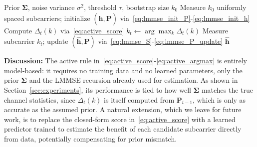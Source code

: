 \begin{algorithm}[t]
\caption{Active Pilot Selection}
\label{alg:active}
\begin{algorithmic}[1]
\Require Prior $\boldsymbol\Sigma$, noise variance $\sigma^2$, threshold $\tau$, bootstrap size $k_0$
\State Measure $k_0$ uniformly spaced subcarriers; initialize $(\hat{\mathbf h},\mathbf P)$ via~\eqref{eq:lmmse_init_P}-\eqref{eq:lmmse_init_h}
    \State Compute $\Delta_t(k)$ via~\eqref{eq:active_score}
  \EndFor
  \State $k_t \gets \arg\max_k \Delta_t(k)$
  \State Measure subcarrier $k_t$; update $(\hat{\mathbf h},\mathbf P)$ via~\eqref{eq:lmmse_S}-\eqref{eq:lmmse_P_update}
\EndWhile
\State \Return $\hat{\mathbf h}$
\end{algorithmic}
\end{algorithm}

\smallskip
\noindent
{\bf Discussion:}
The active rule in~\eqref{eq:active_score}-\eqref{eq:active_argmax} is entirely model-based: it requires no training data and no learned parameters, only the prior $\boldsymbol\Sigma$ and the LMMSE recursion already used for estimation. As shown in Section~\ref{sec:experiments}, its performance is tied to how well $\boldsymbol\Sigma$ matches the true channel statistics, since $\Delta_t(k)$ is itself computed from $\mathbf P_{t-1}$, which is only as accurate as the assumed prior. A natural extension, which we leave for future work, is to replace the closed-form score in~\eqref{eq:active_score} with a learned predictor trained to estimate the benefit of each candidate subcarrier directly from data, potentially compensating for prior mismatch.
